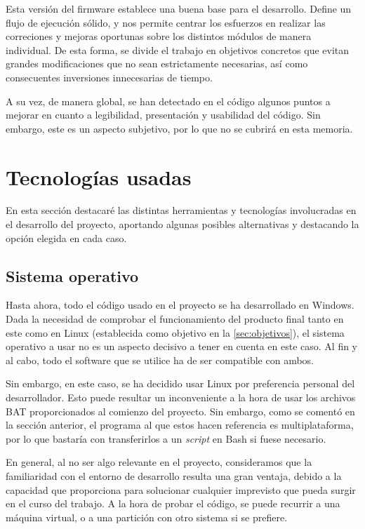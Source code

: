 Esta versión del firmware establece una buena base para el desarrollo. Define un flujo de ejecución sólido, y nos permite centrar los esfuerzos en realizar las correciones y mejoras oportunas sobre los distintos módulos de manera individual. De esta forma, se divide el trabajo en objetivos concretos que evitan grandes modificaciones que no sean estrictamente necesarias, así como consecuentes inversiones innecesarias de tiempo.

A su vez, de manera global, se han detectado en el código algunos puntos a mejorar en cuanto a legibilidad, presentación y usabilidad del código. Sin embargo, este es un aspecto subjetivo, por lo que no se cubrirá en esta memoria.

\section{Tecnologías usadas}

En esta sección destacaré las distintas herramientas y tecnologías involucradas en el desarrollo del proyecto, aportando algunas posibles alternativas y destacando la opción elegida en cada caso.

\subsection{Sistema operativo}

Hasta ahora, todo el código usado en el proyecto se ha desarrollado en Windows. Dada la necesidad de comprobar el funcionamiento del producto final tanto en este como en Linux (establecida como objetivo en la \autoref{sec:objetivos}), el sistema operativo a usar no es un aspecto decisivo a tener en cuenta en este caso. Al fin y al cabo, todo el software que se utilice ha de ser compatible con ambos.

Sin embargo, en este caso, se ha decidido usar Linux por preferencia personal del desarrollador. Esto puede resultar un inconveniente a la hora de usar los archivos BAT proporcionados al comienzo del proyecto. Sin embargo, como se comentó en la sección anterior, el programa al que estos hacen referencia es multiplataforma, por lo que bastaría con transferirlos a un \textit{script} en Bash si fuese necesario.

En general, al no ser algo relevante en el proyecto, consideramos que la familiaridad con el entorno de desarrollo resulta una gran ventaja, debido a la capacidad que proporciona para solucionar cualquier imprevisto que pueda surgir en el curso del trabajo. A la hora de probar el código, se puede recurrir a una máquina virtual, o a una partición con otro sistema si se prefiere.

